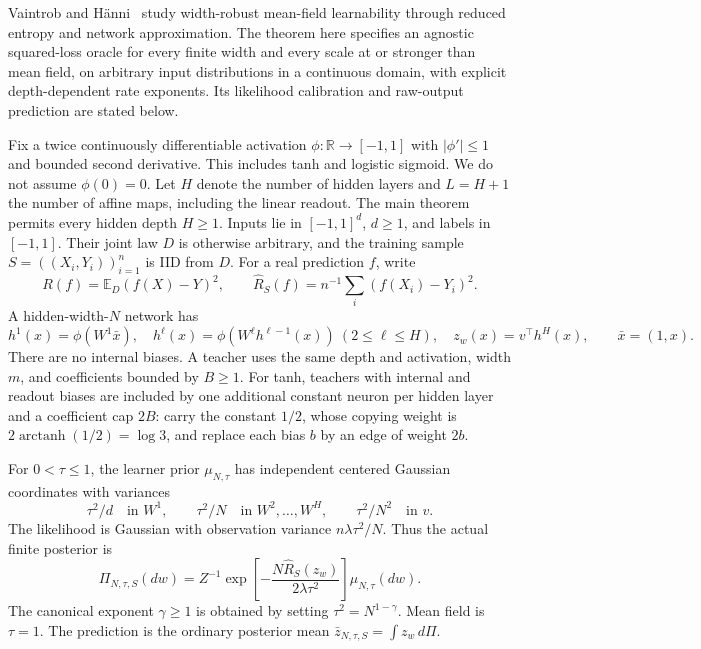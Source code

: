 \documentclass[11pt]{article}
\theoremstyle{remark}\newtheorem{remark}[theorem]{Remark}
\newcommand{\E}{\mathbb E}\newcommand{\R}{\mathbb R}\newcommand{\N}{\mathbb N}\newcommand{\KL}{\operatorname{KL}}\newcommand{\clip}{\operatorname{clip}}\newcommand{\Rad}{\mathfrak R}\newcommand{\op}{\mathrm{op}}
\begin{document}
Vaintrob and H\"anni~\cite{vh} study width-robust mean-field learnability through reduced entropy and network approximation. The theorem here specifies an agnostic squared-loss oracle for every finite width and every scale at or stronger than mean field, on arbitrary input distributions in a continuous domain, with explicit depth-dependent rate exponents. Its likelihood calibration and raw-output prediction are stated below.

Fix a twice continuously differentiable activation $\phi:\R\to[-1,1]$ with $|\phi'|\le1$ and bounded second derivative. This includes tanh and logistic sigmoid. We do not assume $\phi(0)=0$. Let $H$ denote the number of hidden layers and $L=H+1$ the number of affine maps, including the linear readout. The main theorem permits every hidden depth $H\ge1$. Inputs lie in $[-1,1]^d$, $d\ge1$, and labels in $[-1,1]$. Their joint law $D$ is otherwise arbitrary, and the training sample $S=((X_i,Y_i))_{i=1}^n$ is IID from $D$. For a real prediction $f$, write
\[
 R(f)=\E_D(f(X)-Y)^2,\qquad \widehat R_S(f)=n^{-1}\sum_i(f(X_i)-Y_i)^2.
\]
A hidden-width-$N$ network has
\[
 h^1(x)=\phi(W^1\bar x),\quad
 h^\ell(x)=\phi(W^\ell h^{\ell-1}(x))\ (2\le\ell\le H),\quad
 z_w(x)=v^\top h^H(x),\qquad \bar x=(1,x).
\]
There are no internal biases. A teacher uses the same depth and activation, width $m$, and coefficients bounded by $B\ge1$. For tanh, teachers with internal and readout biases are included by one additional constant neuron per hidden layer and a coefficient cap $2B$: carry the constant $1/2$, whose copying weight is $2\operatorname{arctanh}(1/2)=\log3$, and replace each bias $b$ by an edge of weight $2b$.

For $0<\tau\le1$, the learner prior $\mu_{N,\tau}$ has independent centered Gaussian coordinates with variances
\begin{equation}
 \tau^2/d\quad\text{in }W^1,\qquad
 \tau^2/N\quad\text{in }W^2,\ldots,W^H,\qquad
 \tau^2/N^2\quad\text{in }v.
 \label{eq:prior}
\end{equation}
The likelihood is Gaussian with observation variance $n\lambda\tau^2/N$. Thus the actual finite posterior is
\begin{equation}
 \Pi_{N,\tau,S}(dw)=Z^{-1}
    \exp\!\left[-\frac{N\widehat R_S(z_w)}{2\lambda\tau^2}\right]
    \mu_{N,\tau}(dw).
 \label{eq:posterior}
\end{equation}
The canonical exponent $\gamma\ge1$ is obtained by setting $\tau^2=N^{1-\gamma}$. Mean field is $\tau=1$. The prediction is the ordinary posterior mean $\bar z_{N,\tau,S}=\int z_w\,d\Pi$.
\end{document}
